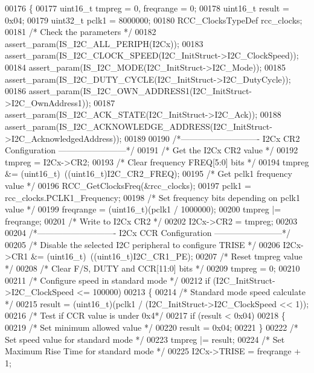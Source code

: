\begin{DoxyCode}
00176 \{
00177   uint16\_t tmpreg = 0, freqrange = 0;
00178   uint16\_t result = 0x04;
00179   uint32\_t pclk1 = 8000000;
00180   RCC\_ClocksTypeDef  rcc\_clocks;
00181   \textcolor{comment}{/* Check the parameters */}
00182   assert_param(IS\_I2C\_ALL\_PERIPH(I2Cx));
00183   assert_param(IS\_I2C\_CLOCK\_SPEED(I2C\_InitStruct->I2C\_ClockSpeed));
00184   assert_param(IS\_I2C\_MODE(I2C\_InitStruct->I2C\_Mode));
00185   assert_param(IS\_I2C\_DUTY\_CYCLE(I2C\_InitStruct->I2C\_DutyCycle));
00186   assert_param(IS\_I2C\_OWN\_ADDRESS1(I2C\_InitStruct->I2C\_OwnAddress1));
00187   assert_param(IS\_I2C\_ACK\_STATE(I2C\_InitStruct->I2C\_Ack));
00188   assert_param(IS\_I2C\_ACKNOWLEDGE\_ADDRESS(I2C\_InitStruct->I2C\_AcknowledgedAddress));
00189 
00190 \textcolor{comment}{/*---------------------------- I2Cx CR2 Configuration ------------------------*/}
00191   \textcolor{comment}{/* Get the I2Cx CR2 value */}
00192   tmpreg = I2Cx->CR2;
00193   \textcolor{comment}{/* Clear frequency FREQ[5:0] bits */}
00194   tmpreg &= (uint16\_t)~((uint16\_t)I2C_CR2_FREQ);
00195   \textcolor{comment}{/* Get pclk1 frequency value */}
00196   RCC_GetClocksFreq(&rcc\_clocks);
00197   pclk1 = rcc\_clocks.PCLK1_Frequency;
00198   \textcolor{comment}{/* Set frequency bits depending on pclk1 value */}
00199   freqrange = (uint16\_t)(pclk1 / 1000000);
00200   tmpreg |= freqrange;
00201   \textcolor{comment}{/* Write to I2Cx CR2 */}
00202   I2Cx->CR2 = tmpreg;
00203 
00204 \textcolor{comment}{/*---------------------------- I2Cx CCR Configuration ------------------------*/}
00205   \textcolor{comment}{/* Disable the selected I2C peripheral to configure TRISE */}
00206   I2Cx->CR1 &= (uint16\_t)~((uint16\_t)I2C_CR1_PE);
00207   \textcolor{comment}{/* Reset tmpreg value */}
00208   \textcolor{comment}{/* Clear F/S, DUTY and CCR[11:0] bits */}
00209   tmpreg = 0;
00210 
00211   \textcolor{comment}{/* Configure speed in standard mode */}
00212   \textcolor{keywordflow}{if} (I2C\_InitStruct->I2C_ClockSpeed <= 100000)
00213   \{
00214     \textcolor{comment}{/* Standard mode speed calculate */}
00215     result = (uint16\_t)(pclk1 / (I2C\_InitStruct->I2C_ClockSpeed << 1));
00216     \textcolor{comment}{/* Test if CCR value is under 0x4*/}
00217     \textcolor{keywordflow}{if} (result < 0x04)
00218     \{
00219       \textcolor{comment}{/* Set minimum allowed value */}
00220       result = 0x04;
00221     \}
00222     \textcolor{comment}{/* Set speed value for standard mode */}
00223     tmpreg |= result;
00224     \textcolor{comment}{/* Set Maximum Rise Time for standard mode */}
00225     I2Cx->TRISE = freqrange + 1;

\end{DoxyCode}
